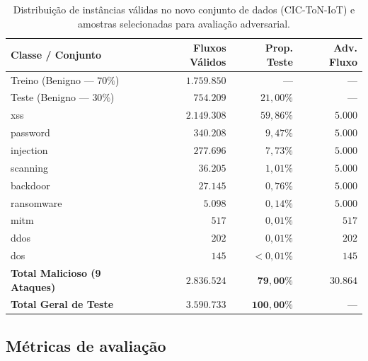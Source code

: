 \documentclass[conference]{IEEEtran}
\begin{document}
\begin{table}[!t]
\centering
\footnotesize
\setlength{\tabcolsep}{4pt}
\caption{Distribuição de instâncias válidas no novo conjunto de dados (CIC-ToN-IoT) e amostras selecionadas para avaliação adversarial.}
\label{tab:cic_ton_iot_dist}
\begin{tabular}{@{}>{\raggedright\arraybackslash}p{2.8cm}rrr@{}}
\toprule
\textbf{Classe / Conjunto} & \textbf{Fluxos Válidos} & \textbf{Prop. Teste} & \textbf{Adv. Fluxo} \\
\midrule
Treino (Benigno — $70\%$) & $1.759.850$ & --- & --- \\
Teste (Benigno — $30\%$) & $754.209$ & $21{,}00\%$ & --- \\
\midrule
xss & $2.149.308$ & $59{,}86\%$ & $5.000$ \\
password & $340.208$ & $9{,}47\%$ & $5.000$ \\
injection & $277.696$ & $7{,}73\%$ & $5.000$ \\
scanning & $36.205$ & $1{,}01\%$ & $5.000$ \\
backdoor & $27.145$ & $0{,}76\%$ & $5.000$ \\
ransomware & $5.098$ & $0{,}14\%$ & $5.000$ \\
mitm & $517$ & $0{,}01\%$ & $517$ \\
ddos & $202$ & $0{,}01\%$ & $202$ \\
dos & $145$ & $<0{,}01\%$ & $145$ \\
\midrule
\textbf{Total Malicioso (9 Ataques)} & $\mathbf{2.836.524}$ & $\mathbf{79{,}00\%}$ & $\mathbf{30.864}$ \\
\textbf{Total Geral de Teste} & $\mathbf{3.590.733}$ & $\mathbf{100{,}00\%}$ & --- \\
\bottomrule
\end{tabular}
\end{table}

\subsection{Métricas de avaliação}
\end{document}

